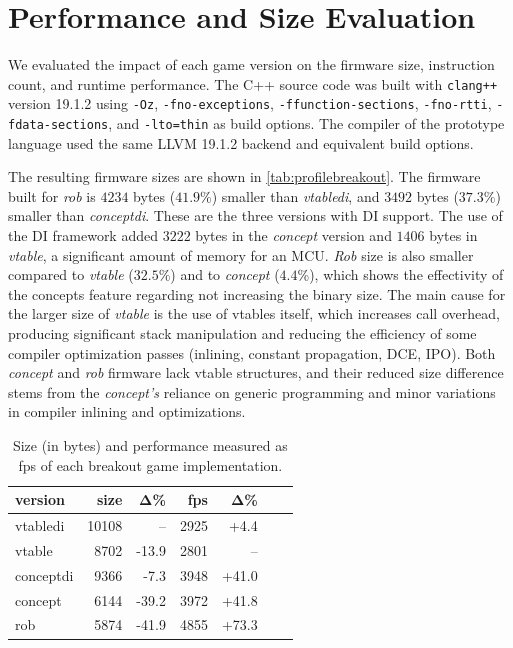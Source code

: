 \documentclass[10pt,sigplan,screen,anonymous]{acmart}
\begin{document}
\section{Performance and Size Evaluation} \label{sec:performance}

We evaluated the impact of each game version on the firmware size, instruction count, and runtime performance. The C++ source code was built with {\tt clang++} version 19.1.2 using {\tt -Oz}, {\tt -fno-exceptions}, {\tt -ffunction-sections}, {\tt -fno-rtti}, {\tt -fdata-sections}, and {\tt -lto=thin} as build options. The compiler of the prototype language used the same LLVM 19.1.2 backend and equivalent build options. 

The resulting firmware sizes are shown in \autoref{tab:profilebreakout}. The firmware built for \emph{rob} is $4234$ bytes ($41.9\%$) smaller than \emph{vtabledi}, and $3492$ bytes ($37.3\%$) smaller than \emph{conceptdi}. These are the three versions with DI support. The use of the DI framework added $3222$ bytes in the \emph{concept} version and $1406$ bytes in \emph{vtable}, a significant amount of memory for an MCU. \emph{Rob} size is also smaller compared to \emph{vtable} ($32.5\%$) and to \emph{concept} ($4.4$\%), which shows the effectivity of the concepts feature regarding not increasing the binary size. The main cause for the larger size of \emph{vtable} is the use of vtables itself, which increases call overhead, producing significant stack manipulation and reducing the efficiency of some compiler optimization passes (inlining, constant propagation, DCE, IPO). Both \emph{concept} and \emph{rob} firmware lack vtable structures, and their reduced size difference stems from the \emph{concept's} reliance on generic programming and minor variations in compiler inlining and optimizations.


\begin{table}[bp]
\caption{Size (in bytes) and performance measured as fps of each breakout game implementation.}\vspace{-8pt}
\label{tab:profilebreakout}
\begin{tabular}{lrrrrrr}
\toprule
\bf version & \bf size & Δ\% & \bf fps & Δ\% \\
\midrule
vtabledi   & 10108 & --     & 2925 & +4.4     \\
vtable     & 8702  & -13.9  & 2801 & --   \\
conceptdi  & 9366  & -7.3   & 3948 & +41.0  \\
concept    & 6144  & -39.2  & 3972 & +41.8  \\
rob        & 5874  & -41.9  & 4855 & +73.3  \\
\bottomrule
\end{tabular}
\end{table}
\end{document}
